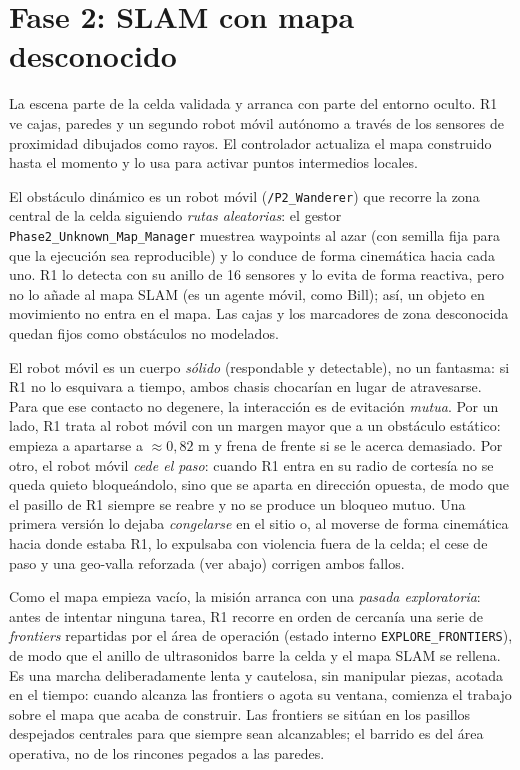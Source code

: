 \chapter{Fase 2: SLAM con mapa desconocido}

La escena  parte de la celda validada y
arranca con parte del entorno oculto. R1 ve cajas, paredes y un segundo robot
móvil autónomo a través de los sensores de proximidad dibujados como rayos.
El controlador actualiza el mapa construido hasta el momento y lo usa para
activar puntos intermedios locales.

El obstáculo dinámico es un robot móvil (\texttt{/P2\_Wanderer}) que recorre la
zona central de la celda siguiendo \emph{rutas aleatorias}: el gestor
\texttt{Phase2\_Unknown\_Map\_Manager} muestrea waypoints al azar (con semilla
fija para que la ejecución sea reproducible) y lo conduce de forma cinemática
hacia cada uno. R1 lo detecta con su anillo de 16 sensores y lo evita de forma
reactiva, pero no lo añade al mapa SLAM (es un agente móvil, como Bill); así, un
objeto en movimiento no entra en el mapa. Las cajas y los marcadores de zona
desconocida quedan fijos como obstáculos no modelados.

El robot móvil es un cuerpo \emph{sólido} (respondable y detectable), no un
fantasma: si R1 no lo esquivara a tiempo, ambos chasis chocarían en lugar de
atravesarse. Para que ese contacto no degenere, la interacción es de evitación
\emph{mutua}. Por un lado, R1 trata al robot móvil con un margen mayor que a un
obstáculo estático: empieza a apartarse a \(\approx0{,}82\) m y frena de frente
si se le acerca demasiado. Por otro, el robot móvil \emph{cede el paso}: cuando R1
entra en su radio de cortesía no se queda quieto bloqueándolo, sino que se aparta
en dirección opuesta, de modo que el pasillo de R1 siempre se reabre y no se
produce un bloqueo mutuo. Una primera versión lo dejaba \emph{congelarse} en el
sitio o, al moverse de forma cinemática hacia donde estaba R1, lo expulsaba con
violencia fuera de la celda; el cese de paso y una geo-valla reforzada (ver
abajo) corrigen ambos fallos.

Como el mapa empieza vacío, la misión arranca con una \emph{pasada exploratoria}:
antes de intentar ninguna tarea, R1 recorre en orden de cercanía una serie de
\emph{frontiers} repartidas por el área de operación (estado interno
\texttt{EXPLORE\_FRONTIERS}), de modo que el anillo de ultrasonidos barre la celda y
el mapa SLAM se rellena. Es una marcha deliberadamente lenta y cautelosa, sin
manipular piezas, acotada en el tiempo: cuando alcanza las frontiers o agota su
ventana, comienza el trabajo sobre el mapa que acaba de construir. Las frontiers se
sitúan en los pasillos despejados centrales para que siempre sean alcanzables; el
barrido es del área operativa, no de los rincones pegados a las paredes.

